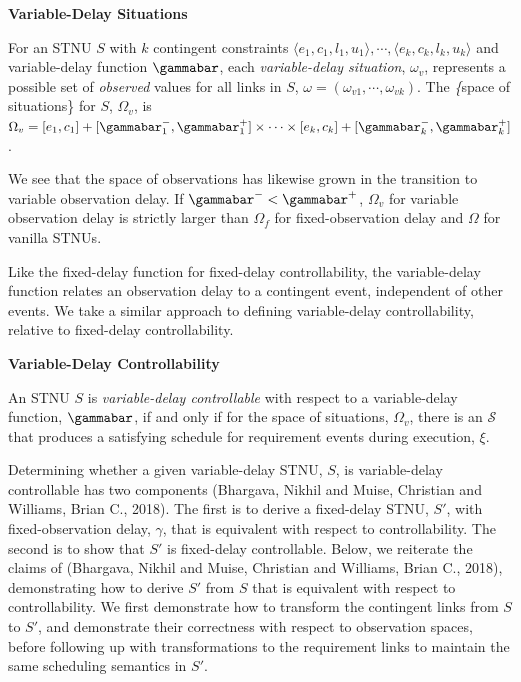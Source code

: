 \documentclass[11pt]{article}
\begin{document}
\begin{defn}
\label{def:omega-v}
\textbf{Variable-Delay Situations}

For an STNU \(S\) with \(k\) contingent constraints \(\langle e_{1}, c_{1}, l_{1}, u_{1} \rangle, \cdots,
\langle e_{k}, c_{k}, l_{k}, u_{k} \rangle\) and variable-delay function \(\gammabar\), each
\textit{variable-delay situation}, \(\omega_{v}\), represents a possible set of \textit{observed}
values for all links in \(S\), \(\omega = (\omega_{v1}, \cdots, \omega_{vk})\). The \textit\{space of
situations\} for \(S\), \(\Omega_{v}\), is \(\Omega_{v} = [e_{1}, c_{1}] + [\gammabar^{-}_{1},
\gammabar^+_{1}] \times \cdots \times [e_{k}, c_{k}] + [\gammabar^{-}_{k}, \gammabar^+_{k}]\).
\end{defn}

We see that the space of observations has likewise grown in the transition to variable observation
delay. If \(\gammabar^{-} < \gammabar^{+}\), \(\Omega_{v}\) for variable observation delay is strictly
larger than \(\Omega_{f}\) for fixed-observation delay and \(\Omega\) for vanilla STNUs.

Like the fixed-delay function for fixed-delay controllability, the variable-delay function relates
an observation delay to a contingent event, independent of other events. We take a similar approach
to defining variable-delay controllability, relative to fixed-delay controllability.

\begin{defn}
\label{def:vdc}
\textbf{Variable-Delay Controllability}

An STNU \(S\) is \emph{variable-delay controllable} with respect to a variable-delay function, \(\gammabar\),
if and only if for the space of situations, \(\Omega_{v}\), there is an \(\mathcal{S}\) that produces a
satisfying schedule for requirement events during execution, \(\xi\).
\end{defn}

Determining whether a given variable-delay STNU, \(S\), is variable-delay controllable has two
components (Bhargava, Nikhil and Muise, Christian and Williams, Brian C., 2018). The first is to derive a fixed-delay STNU, \(S'\), with
fixed-observation delay, \(\gamma\), that is equivalent with respect to controllability. The second is
to show that \(S'\) is fixed-delay controllable. Below, we reiterate the claims of
(Bhargava, Nikhil and Muise, Christian and Williams, Brian C., 2018), demonstrating how to derive \(S'\) from \(S\) that is equivalent with respect to
controllability. We first demonstrate how to transform the contingent links from \(S\) to \(S'\), and
demonstrate their correctness with respect to observation spaces, before following up with
transformations to the requirement links to maintain the same scheduling semantics in \(S'\).
\end{document}
